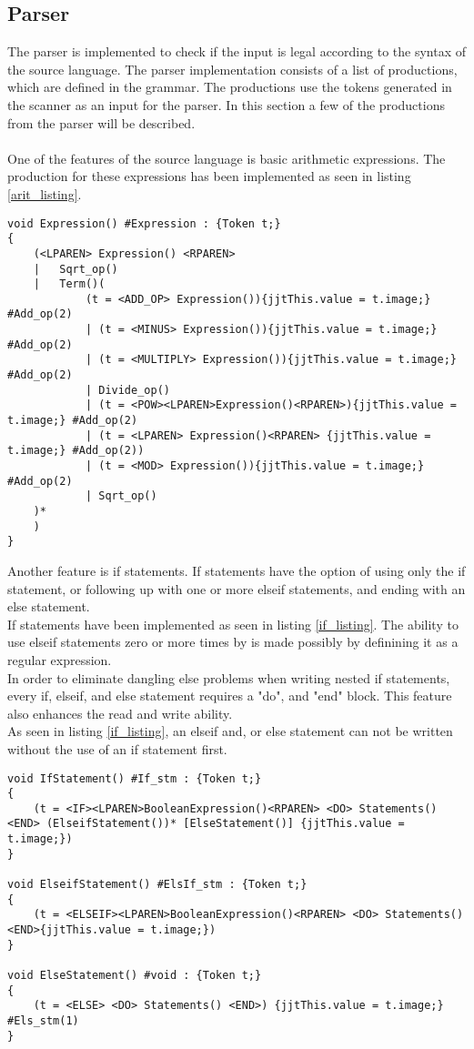 \subsection{Parser}
The parser is implemented to check if the input is legal according to the syntax of the source language. The parser implementation consists of a list of productions, which are defined in the grammar. The productions use the tokens generated in the scanner as an input for the parser. In this section a few of the productions from the parser will be described.
\\
\\One of the features of the source language is basic arithmetic expressions. The production for these expressions has been implemented as seen in listing \ref{arit_listing}. 

\begin{lstlisting}[caption=Implementation of the arithmetic expressions production, label=arit_listing]
void Expression() #Expression : {Token t;}
{
	(<LPAREN> Expression() <RPAREN>
	|	Sqrt_op()
	|	Term()(
			(t = <ADD_OP> Expression()){jjtThis.value = t.image;} #Add_op(2)
			| (t = <MINUS> Expression()){jjtThis.value = t.image;} #Add_op(2)
			| (t = <MULTIPLY> Expression()){jjtThis.value = t.image;} #Add_op(2)
			| Divide_op()
			| (t = <POW><LPAREN>Expression()<RPAREN>){jjtThis.value = t.image;} #Add_op(2)
			| (t = <LPAREN> Expression()<RPAREN> {jjtThis.value = t.image;} #Add_op(2))
			| (t = <MOD> Expression()){jjtThis.value = t.image;} #Add_op(2)
			| Sqrt_op()
	)*
	)
}
\end{lstlisting}
Another feature is if statements. If statements have the option of using only the if statement, or following up with one or more elseif statements, and ending with an else statement. 
\\If statements have been implemented as seen in listing \ref{if_listing}. The ability to use elseif statements zero or more times by is made possibly by definining it as a regular expression.
\\In order to eliminate dangling else problems when writing nested if statements, every if, elseif, and else statement requires a "do", and "end" block. This feature also enhances the read and write ability. 
\\As seen in listing \ref{if_listing}, an elseif and, or else statement can not be written without the use of an if statement first.  

\begin{lstlisting}[caption=Implementation of the if\, elseif\, and else statements, label=if_listing]
void IfStatement() #If_stm : {Token t;}
{
	(t = <IF><LPAREN>BooleanExpression()<RPAREN> <DO> Statements() <END> (ElseifStatement())* [ElseStatement()] {jjtThis.value = t.image;})
}

void ElseifStatement() #ElsIf_stm : {Token t;}
{
	(t = <ELSEIF><LPAREN>BooleanExpression()<RPAREN> <DO> Statements() <END>{jjtThis.value = t.image;})
}

void ElseStatement() #void : {Token t;}
{
	(t = <ELSE> <DO> Statements() <END>) {jjtThis.value = t.image;} #Els_stm(1)
}
\end{lstlisting}

